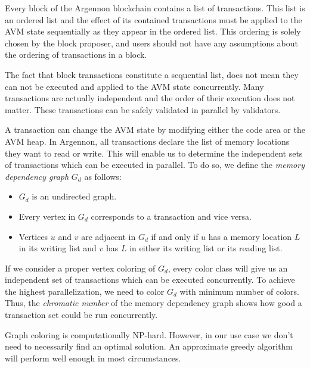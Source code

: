 \documentclass[a4paper]{report}
\begin{document}
    Every block of the Argennon blockchain contains a list of transactions. This list is an ordered list and the
    effect of its contained transactions must be applied to the AVM state sequentially as they appear in the ordered
    list. This ordering is solely chosen by the block proposer, and users should not have any assumptions about
    the ordering of transactions in a block.

    The fact that block transactions constitute a sequential list, does not mean they can not be executed and applied
    to the AVM state concurrently. Many transactions are actually independent and the order of their execution does not
    matter. These transactions can be safely validated in parallel by validators.

    A transaction can change the AVM state by modifying either the code area or the AVM heap. In Argennon, all
    transactions declare the list of memory locations they want to read or write. This will enable us to determine the
    independent sets of transactions which can be executed in parallel. To do so, we define the \emph{memory dependency
    graph} \(G_d\) as follows:

    \begin{itemize}
        \item \(G_d\) is an undirected graph.
        \item Every vertex in \(G_d\) corresponds to a transaction and vice versa.
        \item Vertices \(u\) and \(v\) are adjacent in \(G_d\) if and only if \(u\) has a memory location \(L\) in its
        writing list and \(v\) has \(L\) in either its writing list or its reading list.
    \end{itemize}

    If we consider a proper vertex coloring of \(G_d\), every color class will give us an independent set of
    transactions which can be executed concurrently. To achieve the highest parallelization, we need to color \(G_d\)
    with minimum number of colors. Thus, the \emph{chromatic number} of the memory dependency graph shows how good a
    transaction set could be run concurrently.

    Graph coloring is computationally NP-hard. However, in our use case we don't need to necessarily find an optimal
    solution. An approximate greedy algorithm will perform well enough in most circumstances.
\end{document}
